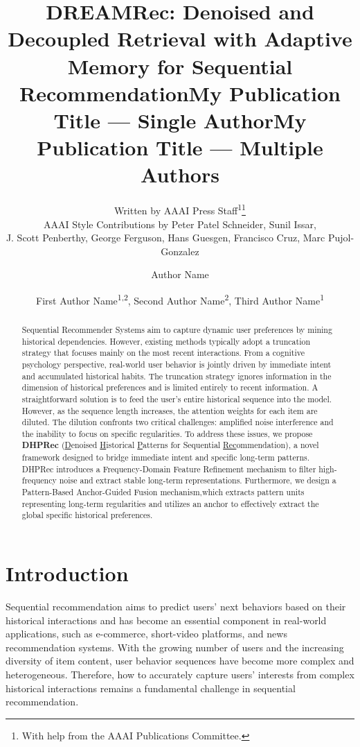 \documentclass[letterpaper]{article} %
\title{DREAMRec: Denoised and Decoupled Retrieval with Adaptive Memory for Sequential Recommendation}
\author{
    Written by AAAI Press Staff\textsuperscript{\rm 1}\thanks{With help from the AAAI Publications Committee.}\\
    AAAI Style Contributions by Peter Patel Schneider,
    Sunil Issar,\\
    J. Scott Penberthy,
    George Ferguson,
    Hans Guesgen,
    Francisco Cruz\equalcontrib\corresponding,
    Marc Pujol-Gonzalez\equalcontrib\corresponding
}
\title{My Publication Title --- Single Author}
\author {
    Author Name
}
\title{My Publication Title --- Multiple Authors}
\author {
    First Author Name\textsuperscript{\rm 1,\rm 2}\equalcontrib,
    Second Author Name\textsuperscript{\rm 2}\equalcontrib,
    Third Author Name\textsuperscript{\rm 1}\corresponding
}
\theoremstyle{definition} %
\begin{document}
\maketitle

\begin{abstract}
Sequential Recommender Systems aim to capture dynamic user preferences by mining historical dependencies. However, existing methods typically adopt a truncation strategy that focuses mainly on the most recent interactions. From a cognitive psychology perspective, real-world user behavior is jointly driven by immediate intent and accumulated historical habits. The truncation strategy ignores information in the dimension of historical preferences and is limited entirely to recent information. A straightforward solution is to feed the user’s
entire historical sequence into the model. However, as the sequence length increases, the attention weights for each item are diluted. The dilution confronts two critical challenges: amplified noise interference and the inability to focus on specific regularities. To address these issues, we propose \textbf{DHPRec} (\underline{D}enoised \underline{H}istorical \underline{P}atterns for Sequential \underline{Rec}ommendation), a novel framework designed to bridge immediate intent and specific long-term patterns. DHPRec introduces a Frequency-Domain Feature Refinement mechanism to filter high-frequency noise and extract stable long-term representations. Furthermore, we design a Pattern-Based Anchor-Guided Fusion mechanism,which extracts pattern units representing long-term regularities and utilizes an anchor to effectively extract the global specific historical preferences. 
\end{abstract}


\section{Introduction}

Sequential recommendation aims to predict users' next behaviors based on their historical interactions and has become an essential component in real-world applications, such as e-commerce, short-video platforms, and news recommendation systems. With the growing number of users and the increasing diversity of item content, user behavior sequences have become more complex and heterogeneous. Therefore, how to accurately capture users' interests from complex historical interactions remains a fundamental challenge in sequential recommendation.
\end{document}
